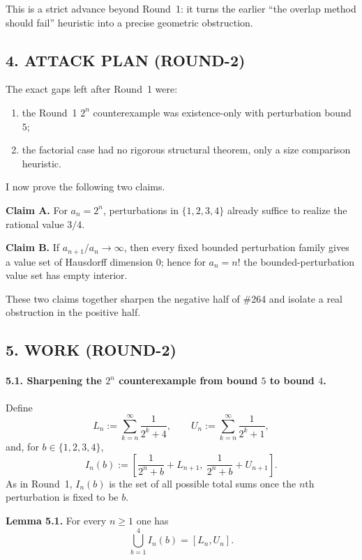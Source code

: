 This is a strict advance beyond Round~1: it turns the earlier ``the overlap method should fail'' heuristic into a precise geometric obstruction.

\subsection*{4. ATTACK PLAN (ROUND-2)}

The exact gaps left after Round~1 were:

\begin{enumerate}
\item the Round~1 $2^n$ counterexample was existence-only with perturbation bound $5$;
\item the factorial case had no rigorous structural theorem, only a size comparison heuristic.
\end{enumerate}

I now prove the following two claims.

\medskip
\noindent
\textbf{Claim A.}
For $a_n=2^n$, perturbations in $\{1,2,3,4\}$ already suffice to realize the rational value $3/4$.

\medskip
\noindent
\textbf{Claim B.}
If $a_{n+1}/a_n\to\infty$, then every fixed bounded perturbation family gives a value set of Hausdorff dimension $0$; hence for $a_n=n!$ the bounded-perturbation value set has empty interior.

\medskip
These two claims together sharpen the negative half of \#264 and isolate a real obstruction in the positive half.

\subsection*{5. WORK (ROUND-2)}

\paragraph{5.1. Sharpening the $2^n$ counterexample from bound $5$ to bound $4$.}

Define
\[
L_n:=\sum_{k=n}^{\infty}\frac{1}{2^k+4},
\qquad
U_n:=\sum_{k=n}^{\infty}\frac{1}{2^k+1},
\]
and, for $b\in\{1,2,3,4\}$,
\[
I_n(b):=\left[\frac{1}{2^n+b}+L_{n+1},\ \frac{1}{2^n+b}+U_{n+1}\right].
\]
As in Round~1, $I_n(b)$ is the set of all possible total sums once the $n$th perturbation is fixed to be $b$.

\medskip
\noindent
\textbf{Lemma 5.1.}
For every $n\ge 1$ one has
\[
\bigcup_{b=1}^4 I_n(b)=[L_n,U_n].
\]

